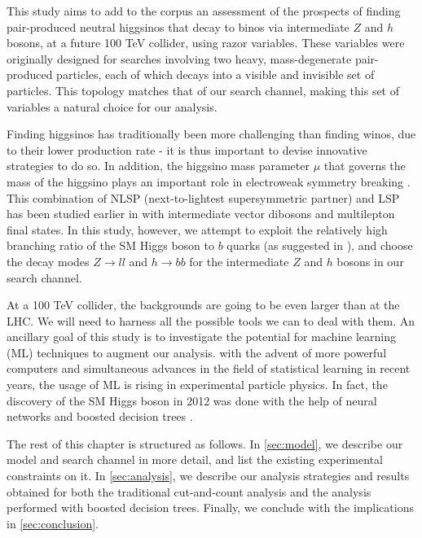 This study aims to add to the corpus an assessment of the prospects of finding pair-produced neutral higgsinos that decay to binos via intermediate $Z$ and $h$ bosons, at a future 100 TeV collider, using razor variables. These variables \citep{Rogan:2010kb} were originally designed for searches involving two heavy, mass-degenerate pair-produced particles, each of which decays into a visible and invisible set of particles. This topology matches that of our search channel, making this set of variables a natural choice for our analysis.

Finding higgsinos has traditionally been more challenging than finding winos, due to their lower production rate - it is thus important to devise innovative strategies to do so. In addition, the higgsino mass parameter $\mu$ that governs the mass of the higgsino plays an important role in electroweak symmetry breaking \citep{Acharya:2014pua}. This combination of NLSP (next-to-lightest supersymmetric partner) and LSP has been studied earlier in \citep{Gori:2014oua} with intermediate vector dibosons and multilepton final states. In this study, however, we attempt to exploit the relatively high branching ratio of the SM Higgs boson to $b$ quarks (as suggested in \cite{Han:2013kza}), and choose the decay modes $Z\rightarrow ll$ and $h\rightarrow bb$ for the intermediate $Z$ and $h$ bosons in our search channel.  

At a 100 TeV collider, the backgrounds are going to be even larger than at the LHC. We will need to harness all the possible tools we can to deal with them. An ancillary goal of this study is to investigate the potential for machine learning (ML) techniques to augment our analysis. with the advent of more powerful computers and simultaneous advances in the field of statistical learning in recent years, the usage of ML is rising in experimental particle physics. In fact, the discovery of the SM Higgs boson in 2012 was done with the help of neural networks \citep{Aad:2012tfa} and boosted decision trees \citep{Chatrchyan:2012xdj}.

The rest of this chapter is structured as follows. In \autoref{sec:model}, we describe our model and search channel in more detail, and list the existing experimental constraints on it. In \autoref{sec:analysis}, we describe our analysis strategies and results obtained for both the traditional cut-and-count analysis and the analysis performed with boosted decision trees. Finally, we conclude with the implications in \autoref{sec:conclusion}.

